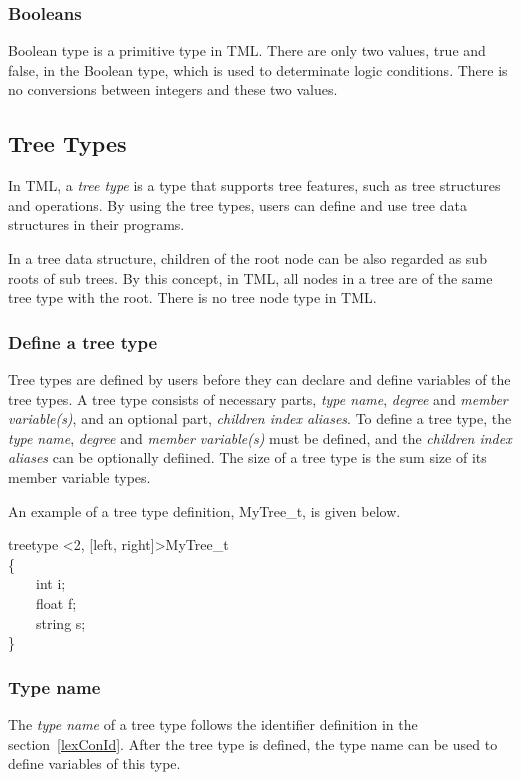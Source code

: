 \documentclass[12pt,psfig,a4]{article}
\begin{document}
\subsubsection {Booleans}
Boolean type is a primitive type in TML. There are only two values, true and false, in the Boolean type, which is used to determinate logic conditions. There is no conversions between integers and these two values.

\subsection {Tree Types}
In TML, a \textit{tree type} is a type that supports tree features, such as tree structures and operations. By using the tree types, users can define and use tree data structures in their programs.

In a tree data structure, children of the root node can be also regarded as sub roots of sub trees. By this concept, in TML, all nodes in a tree are of the same tree type with the root. There is no tree node type in TML.

\subsubsection {Define a tree type}
Tree types are defined by users before they can declare and define variables of the tree types. A tree type consists of necessary parts, \textit{type name}, \textit{degree} and \textit{member variable(s)}, and an optional part, \textit{children index aliases}. To define a tree type, the \textit{type name}, \textit{degree} and \textit{member variable(s)} must be defined, and the \textit{children index aliases} can be optionally defiined. The size of a tree type is the sum size of its member variable types.

An example of a tree type definition, MyTree\_t, is given below.

\begin{code}
\begin{tabbing}
treetype \textless2, [left, right]\textgreater MyTree\_t \\
\{\\
~~~~int i;\\
~~~~float f;\\
~~~~string s;\\
\}
\end{tabbing}
\end{code}


\subsubsection {Type name}
The \textit{type name} of a tree type follows the identifier definition in the section~\ref{lexConId}. After the tree type is defined, the type name can be used to define variables of this type.
\end{document}
